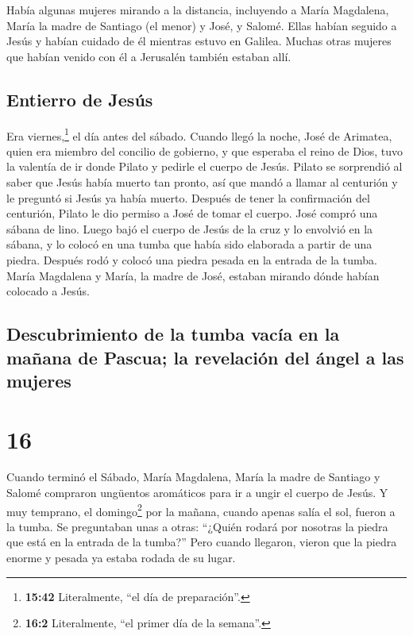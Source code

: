  Había algunas mujeres mirando a la distancia, incluyendo
a María Magdalena, María la madre de Santiago (el menor) y José, y
Salomé.  Ellas habían seguido a Jesús y habían cuidado de
él mientras estuvo en Galilea. Muchas otras mujeres que habían venido
con él a Jerusalén también estaban allí.

\hypertarget{entierro-de-jesuxfas}{%
\subsection{Entierro de Jesús}\label{entierro-de-jesuxfas}}

 Era viernes,\footnote{\textbf{15:42} Literalmente, ``el
  día de preparación''.} el día antes del sábado. Cuando llegó la noche,
 José de Arimatea, quien era miembro del concilio de
gobierno, y que esperaba el reino de Dios, tuvo la valentía de ir donde
Pilato y pedirle el cuerpo de Jesús.  Pilato se
sorprendió al saber que Jesús había muerto tan pronto, así que mandó a
llamar al centurión y le preguntó si Jesús ya había muerto.
 Después de tener la confirmación del centurión, Pilato
le dio permiso a José de tomar el cuerpo.  José compró
una sábana de lino. Luego bajó el cuerpo de Jesús de la cruz y lo
envolvió en la sábana, y lo colocó en una tumba que había sido elaborada
a partir de una piedra. Después rodó y colocó una piedra pesada en la
entrada de la tumba.  María Magdalena y María, la madre
de José, estaban mirando dónde habían colocado a Jesús.

\hypertarget{descubrimiento-de-la-tumba-vacuxeda-en-la-mauxf1ana-de-pascua-la-revelaciuxf3n-del-uxe1ngel-a-las-mujeres}{%
\subsection{Descubrimiento de la tumba vacía en la mañana de Pascua; la
revelación del ángel a las
mujeres}\label{descubrimiento-de-la-tumba-vacuxeda-en-la-mauxf1ana-de-pascua-la-revelaciuxf3n-del-uxe1ngel-a-las-mujeres}}

\hypertarget{section-15}{%
\section{16}\label{section-15}}

 Cuando terminó el Sábado, María Magdalena, María la madre
de Santiago y Salomé compraron ungüentos aromáticos para ir a ungir el
cuerpo de Jesús.  Y muy temprano, el domingo\footnote{\textbf{16:2}
  Literalmente, ``el primer día de la semana''.} por la mañana, cuando
apenas salía el sol, fueron a la tumba.  Se preguntaban
unas a otras: ``¿Quién rodará por nosotras la piedra que está en la
entrada de la tumba?''  Pero cuando llegaron, vieron que
la piedra enorme y pesada ya estaba rodada de su lugar.

